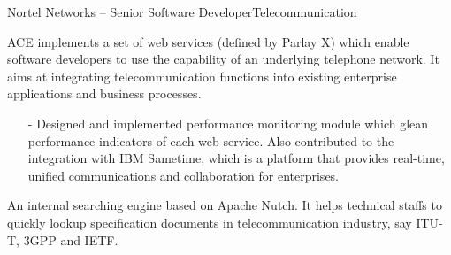 \documentclass[11pt,a4paper]{moderncv}
\begin{document}
%    
\vspace{2ex}  
{Nortel Networks -- Senior Software Developer}{Telecommunication}{}{}{}
{
  ACE implements a set of web services (defined by Parlay X) which enable software developers to use the capability of an underlying telephone network. It aims at integrating telecommunication functions into existing enterprise applications and business processes. 
  \begin{itemize}
    \item[-] Designed and implemented performance monitoring module which glean performance indicators of each web service. Also contributed to the integration with IBM Sametime, which is a platform that provides real-time, unified communications and collaboration for enterprises.
  \end{itemize}
}

\vspace*{0.2\baselineskip}
{
    An internal searching engine based on Apache Nutch. It helps technical staffs to quickly lookup specification documents in telecommunication industry, say ITU-T, 3GPP and IETF.
}
\end{document}
